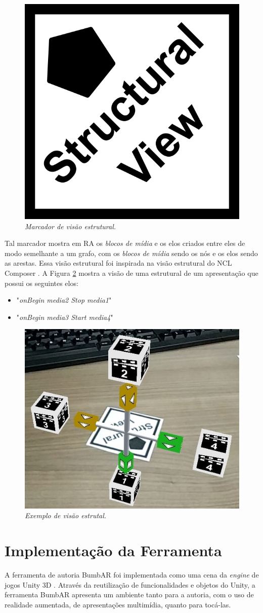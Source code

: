 \documentclass[../main.tex]{subfiles}
\begin{document}
\begin{figure}[!ht]
\centering
\includegraphics[width=0.2\linewidth]{IMG/Marcadores/estrutural_marker.png}
\caption{\textit{Marcador de visão estrutural.}}
\label{fig:estrutural_marker}
\end{figure}

Tal marcador mostra em RA os \emph{blocos de mídia} e os elos criados entre eles de modo semelhante a um grafo, com os \emph{blocos de mídia} sendo os nós e os elos sendo as arestas. Essa visão estrutural foi inspirada na visão estrutural do NCL Composer \cite{azevedo2014composer}. A Figura \ref{fig:estrutual} mostra a visão de uma estrutural de um apresentação que possui os seguintes elos:
\begin{itemize}
    \item "\emph{onBegin media2 Stop media1}"
    \item "\emph{onBegin media3 Start media4}"
\end{itemize}

\begin{figure}[!ht]
\centering
\includegraphics[width=0.45\linewidth]{IMG/estrutural.jpg}
\caption{\textit{Exemplo de visão estrutal.}}
\label{fig:estrutual}
\end{figure}

\section{Implementação da Ferramenta}
\label{sec:implementacao_prototipo}

A ferramenta de autoria BumbAR foi implementada como uma cena da \emph{engine} de jogos Unity 3D \cite{unity}. Através da reutilização de funcionalidades e objetos do Unity, a ferramenta BumbAR apresenta um ambiente tanto para a autoria, com o uso de realidade aumentada, de apresentações multimídia, quanto para tocá-las.
\end{document}
